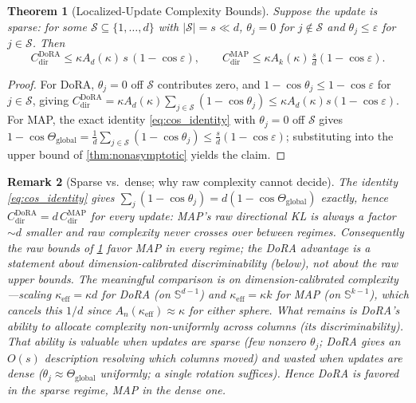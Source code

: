 \documentclass[10pt]{article}
\newtheorem{theorem}{Theorem}[section]
\newtheorem{remark}[theorem]{Remark}
\newcommand{\Ad}{A_d}
\newcommand{\Ak}{A_k}
\newcommand{\Sd}{\mathbb{S}^{d-1}}
\newcommand{\Sk}{\mathbb{S}^{k-1}}
\newcommand{\Thetaglob}{\Theta_{\mathrm{global}}}
\begin{document}
\setcounter{theorem}{11} %
\begin{theorem}[Localized-Update Complexity Bounds]\label{thm:dora_advantage}
Suppose the update is sparse: for some $\mathcal{S}\subseteq\{1,\dots,d\}$ with
$|\mathcal{S}|=s\ll d$, $\theta_j=0$ for $j\notin\mathcal{S}$ and
$\theta_j\le\varepsilon$ for $j\in\mathcal{S}$. Then
\[
C^{\mathrm{DoRA}}_{\mathrm{dir}}\le\kappa \Ad(\kappa)\,s\,(1-\cos\varepsilon),
\qquad
C^{\mathrm{MAP}}_{\mathrm{dir}}\le\kappa \Ak(\kappa)\,\tfrac{s}{d}(1-\cos\varepsilon).
\]
\end{theorem}
\begin{proof}
For DoRA, $\theta_j=0$ off $\mathcal{S}$ contributes zero, and $1-\cos\theta_j\le1-\cos\varepsilon$
for $j\in\mathcal{S}$, giving $C^{\mathrm{DoRA}}_{\mathrm{dir}}=\kappa \Ad(\kappa)\sum_{j\in\mathcal{S}}(1-\cos\theta_j)\le\kappa \Ad(\kappa)s(1-\cos\varepsilon)$.
For MAP, the exact identity \eqref{eq:cos_identity} with $\theta_j=0$ off $\mathcal{S}$ gives
$1-\cos\Thetaglob=\frac1d\sum_{j\in\mathcal{S}}(1-\cos\theta_j)\le\frac{s}{d}(1-\cos\varepsilon)$;
substituting into the upper bound of \cref{thm:nonasymptotic} yields the claim.
\end{proof}

\begin{remark}[Sparse vs.\ dense; why raw complexity cannot decide]\label{rem:regimes}
The identity \eqref{eq:cos_identity} gives $\sum_j(1-\cos\theta_j)=d(1-\cos\Thetaglob)$
\emph{exactly}, hence $C^{\mathrm{DoRA}}_{\mathrm{dir}}=d\,C^{\mathrm{MAP}}_{\mathrm{dir}}$ for
\emph{every} update: MAP's raw directional KL is always a factor ${\sim}d$ smaller and
raw complexity \emph{never crosses over} between regimes. Consequently the raw bounds
of \cref{thm:dora_advantage} favor MAP in \emph{every} regime; the DoRA advantage is a
statement about dimension-calibrated \emph{discriminability} (below), not about the raw
upper bounds. The meaningful comparison is
on \emph{dimension-calibrated} complexity---scaling $\kappa_{\mathrm{eff}}=\kappa d$ for
DoRA (on $\Sd$) and $\kappa_{\mathrm{eff}}=\kappa k$ for MAP (on $\Sk$), which cancels
this $1/d$ since $A_n(\kappa_{\mathrm{eff}})\!\approx\!\kappa$ for either sphere. What
remains is DoRA's ability to allocate complexity \emph{non-uniformly} across columns
(its discriminability). That ability is valuable when updates are \emph{sparse} (few
nonzero $\theta_j$; DoRA gives an $O(s)$ description resolving which columns moved) and
wasted when updates are \emph{dense} ($\theta_j\approx\Thetaglob$ uniformly; a single
rotation suffices). Hence DoRA is favored in the sparse regime, MAP in the dense one.
\end{remark}
\end{document}
